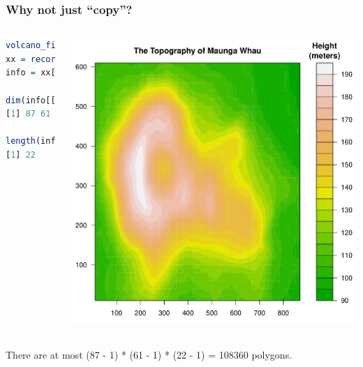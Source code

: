 \documentclass{beamer}
\begin{document}



\begin{frame}[fragile]
\frametitle{Why not just ``copy''?}

\begin{columns}[c]
\begin{lstlisting}[language = R]
volcano_filled.contour()
xx = recordPlot()
info = xx[[1]][[12]][[2]]

dim(info[[4]])
[1] 87 61

length(info[[5]])
[1] 22
 
\end{lstlisting}
\begin{center}
\includegraphics{plot/filled_example_1}
\end{center}

\end{columns}
There are at most (87 - 1) * (61 - 1) * (22 - 1) =  108360 polygons.


\end{frame}


\end{document}
